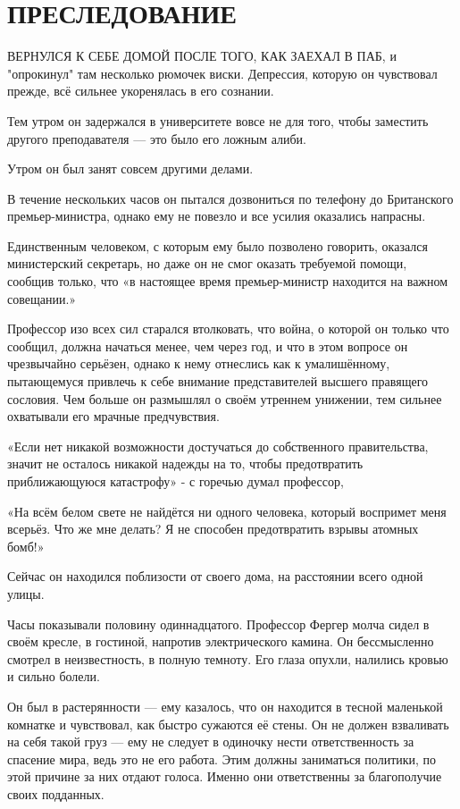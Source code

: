 \documentclass[a4paper,12pt]{book}
\begin{document}
\chapter{ПРЕСЛЕДОВАНИЕ}
\noindent{} ВЕРНУЛСЯ К СЕБЕ ДОМОЙ ПОСЛЕ ТОГО, КАК ЗАЕХАЛ В ПАБ, и "опрокинул" там несколько рюмочек виски. Депрессия, которую он чувствовал прежде, всё сильнее укоренялась в его сознании.
\par
Тем утром он задержался в университете вовсе не для того, чтобы заместить другого преподавателя — это было его ложным алиби.
\par
Утром он был занят совсем другими делами.
\par
В течение нескольких часов он пытался дозвониться по телефону до Британского премьер-министра, однако ему не повезло и все усилия оказались напрасны.
\par
Единственным человеком, с которым ему было позволено говорить, оказался министерский секретарь, но даже он не смог оказать требуемой помощи, сообщив только, что «в настоящее время премьер-министр находится на важном совещании.»
\par
Профессор изо всех сил старался втолковать, что война, о которой он только что сообщил, должна начаться менее, чем через год, и что в этом вопросе он чрезвычайно серьёзен, однако к нему отнеслись как к умалишённому, пытающемуся привлечь к себе внимание представителей высшего правящего сословия. Чем больше он размышлял о своём утреннем унижении, тем сильнее охватывали его мрачные предчувствия.
\par
«Если нет никакой возможности достучаться до собственного правительства, значит не осталось никакой надежды на то, чтобы предотвратить приближающуюся катастрофу» - с горечью думал профессор,
\par
«На всём белом свете не найдётся ни одного человека, который воспримет меня всерьёз. Что же мне делать? Я не способен предотвратить взрывы атомных бомб!»
\par
Сейчас он находился поблизости от своего дома, на расстоянии всего одной улицы.\\
\par
Часы показывали половину одиннадцатого. Профессор Фергер молча сидел в своём кресле, в гостиной, напротив электрического камина. Он бессмысленно смотрел в неизвестность, в полную темноту. Его глаза опухли, налились кровью и сильно болели.
\par
Он был в растерянности — ему казалось, что он находится в тесной маленькой комнатке и чувствовал, как быстро сужаются её стены. Он не должен взваливать на себя такой груз — ему не следует в одиночку нести ответственность за спасение мира, ведь это не его работа. Этим должны заниматься политики, по этой причине за них отдают голоса. Именно они ответственны за благополучие своих подданных.
\end{document}
